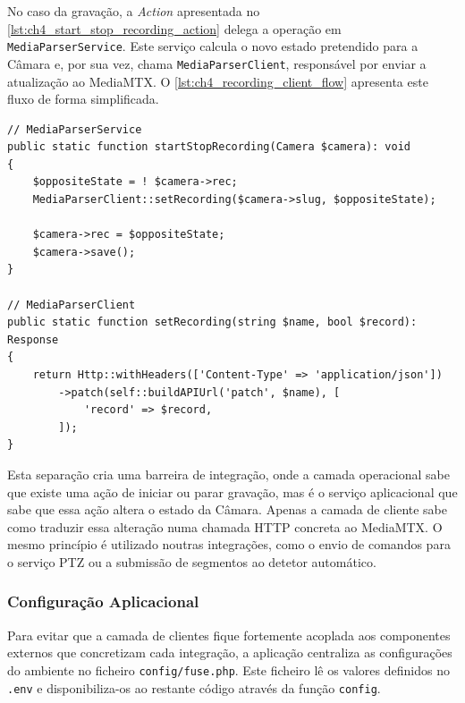 No caso da gravação, a \textit{Action} apresentada no \autoref{lst:ch4_start_stop_recording_action} delega a operação em \texttt{MediaParserService}. Este serviço calcula o novo estado pretendido para a Câmara e, por sua vez, chama \texttt{MediaParserClient}, responsável por enviar a atualização ao MediaMTX. O \autoref{lst:ch4_recording_client_flow} apresenta este fluxo de forma simplificada.

\par\noindent\begin{minipage}{\linewidth}
\begin{lstlisting}[caption={Excerto simplificado de alteração de gravação para o cliente \textit{media-parser} (php)},label={lst:ch4_recording_client_flow}]
// MediaParserService
public static function startStopRecording(Camera $camera): void
{
    $oppositeState = ! $camera->rec;
    MediaParserClient::setRecording($camera->slug, $oppositeState);

    $camera->rec = $oppositeState;
    $camera->save();
}

// MediaParserClient
public static function setRecording(string $name, bool $record): Response
{
    return Http::withHeaders(['Content-Type' => 'application/json'])
        ->patch(self::buildAPIUrl('patch', $name), [
            'record' => $record,
        ]);
}
\end{lstlisting}
\end{minipage}

Esta separação cria uma barreira de integração, onde a camada operacional sabe que existe uma ação de iniciar ou parar gravação, mas é o serviço aplicacional que sabe que essa ação altera o estado da Câmara. Apenas a camada de cliente sabe como traduzir essa alteração numa chamada HTTP concreta ao MediaMTX. O mesmo princípio é utilizado noutras integrações, como o envio de comandos para o serviço PTZ ou a submissão de segmentos ao detetor automático.

\subsubsection{Configuração Aplicacional}

Para evitar que a camada de clientes fique fortemente acoplada aos componentes externos que concretizam cada integração, a aplicação centraliza as configurações do ambiente no ficheiro \texttt{config/fuse.php}. Este ficheiro lê os valores definidos no \texttt{.env} e disponibiliza-os ao restante código através da função \texttt{config}.

